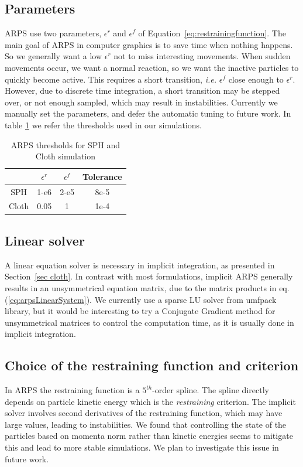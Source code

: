 \subsection{ Parameters }
ARPS use two parameters, $\epsilon^{r}$ and $\epsilon^{f}$ of Equation~\ref{eq:restrainingfunction}.
The main goal of ARPS in computer graphics is to save time when nothing happens.
So we generally want a low $\epsilon^{r}$ not to miss interesting movements.
When sudden movements occur, we want a normal reaction, so we want the inactive particles to quickly become active.
This requires a short transition, \textit{i.e.} $\epsilon^{f}$ close enough to $\epsilon^{r}$.
However, due to discrete time integration, a short transition may be stepped over, or not enough sampled, which may result in instabilities.
Currently we manually set the parameters, and defer the automatic tuning to future work.
In table \ref{tab:parameters} we refer the thresholds used in our simulations.
\begin{table}[htb]
    \centering
    \begin{tabular}{|c|c|c|c|} \hline
                & $\epsilon^{r}$    & $\epsilon^{f}$ & Tolerance \\ \hline
        SPH     &   1-e6            & 2-e5          & 8e-5 \\ \hline
        Cloth  &   0.05            & 1             & 1e-4 \\ \hline
\end{tabular}
    \caption[ARPS: Parameters for ARPS solver]{\label{tab:parameters} ARPS thresholds for SPH and Cloth simulation}
\end{table}

\subsection{Linear solver}
A linear equation solver is necessary in implicit integration, as presented in Section~\ref{sec cloth}.
In contrast with most formulations, implicit ARPS generally results in an unsymmetrical equation matrix, due to the matrix products in eq.(\ref{eq:arpsLinearSystem}).
We currently use a sparse LU solver from umfpack library, but it would be interesting to try a Conjugate Gradient method for unsymmetrical matrices to control the computation time, as it is usually done in implicit integration.

\subsection{Choice of the restraining function and criterion}
In ARPS the restraining function is a $5^{th}$-order spline.
The spline directly depends on particle kinetic energy which is the \emph{restraining} criterion.
The implicit solver involves second derivatives of the restraining function, which may have large values, leading to instabilities.
We found that controlling the state of the particles based on momenta norm rather than kinetic energies seems to mitigate this and lead to more stable simulations.
We plan to investigate this issue in future work.


